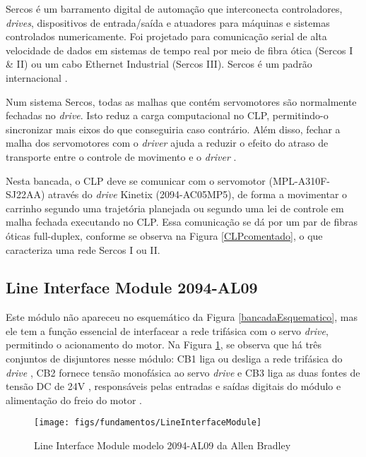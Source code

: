 Sercos é um barramento digital de automação que interconecta controladores, \textit{drives}, dispositivos de entrada/saída e atuadores para máquinas e sistemas controlados numericamente. Foi projetado para comunicação serial de alta velocidade de dados em sistemas de tempo real por meio de fibra ótica (Sercos I \& II) ou um cabo Ethernet Industrial (Sercos III). Sercos é um padrão internacional \cite{sercos}.

Num sistema Sercos, todas as malhas que contém servomotores são normalmente fechadas no \textit{drive}. Isto reduz a carga computacional no CLP, permitindo-o sincronizar mais eixos do que conseguiria caso contrário. Além disso, fechar a malha dos servomotores com o \textit{driver} ajuda a reduzir o efeito do atraso de transporte entre o controle de movimento e o \textit{driver} \cite{sercos}.

Nesta bancada, o CLP deve se comunicar com o servomotor (MPL-A310F-SJ22AA) através do \textit{drive} Kinetix (2094-AC05MP5), de forma a movimentar o carrinho segundo uma trajetória planejada ou segundo uma lei de controle em malha fechada executando no CLP. Essa comunicação se dá por um par de fibras óticas full-duplex, conforme se observa na Figura \ref{CLPcomentado}, o que caracteriza uma rede Sercos I ou II.

\subsection{Line Interface Module 2094-AL09}

Este módulo não apareceu no esquemático da Figura \ref{bancadaEsquematico}, mas ele tem a função essencial de interfacear a rede trifásica com o servo \textit{drive}, permitindo o acionamento do motor. Na Figura \ref{LineInterfaceModule}, se observa que há três conjuntos de disjuntores nesse módulo: CB1 \textendash{} liga ou desliga a rede trifásica do \textit{drive}  \textendash{}, CB2 \textendash{} fornece tensão monofásica ao servo \textit{drive} \textendash{} e CB3 \textendash{} liga as duas fontes de tensão DC de 24V \textendash{}, responsáveis pelas entradas e saídas digitais do módulo e alimentação do freio do motor \cite{redytton}.

\begin{figure}[!ht]
  \centering
    \texttt{[image: figs/fundamentos/LineInterfaceModule]}
    \caption{Line Interface Module modelo 2094-AL09 da Allen Bradley \cite{redytton}\label{LineInterfaceModule}}
\end{figure}

